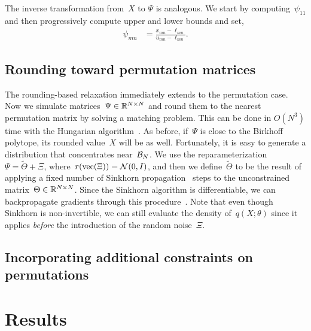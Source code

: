 The inverse transformation from~$X$ to $\Psi$ is analogous.
We start by computing~$\psi_{11}$ and then progressively compute
upper and lower bounds and set,
\begin{align}
\psi_{mn} &= \frac{x_{mn} - \ell_{mn}}{u_{mn} - \ell_{mn}}.
\end{align}


\subsection{Rounding toward permutation matrices}

The rounding-based relaxation immediately extends to the permutation
case.  Now we simulate matrices~$\Psi \in \mathbb{R}^{N \times N}$ and
round them to the nearest permutation matrix by solving a matching
problem.  This can be done in $O(N^3)$ time with the Hungarian
algorithm~\citep{kuhn1955hungarian, munkres1957algorithms}.  As
before, if~$\Psi$ is close to the Birkhoff polytope, its rounded
value~$X$ will be as well.  Fortunately, it is easy to generate a
distribution that concentrates near~$\mathcal{B}_N$.  We use the
reparameterization~${\Psi = \widetilde{\Theta} + \Xi}$,
where~${r(\operatorname{vec}(\Xi)) = \mathcal{N}(0, I)}$, and then we
define~${\widetilde{\Theta}}$ to be the
result of applying a fixed number of Sinkhorn propagation~\citep{knight2008sinkhorn} steps
to the unconstrained matrix~$\Theta \in \mathbb{R}^{N \times N}$.
Since the Sinkhorn algorithm is differentiable, we can backpropagate
gradients through this procedure~\citep[c.f.][]{adams2011ranking}.
Note that even though Sinkhorn is non-invertible, we can still
evaluate the density of~$q(X; \theta)$ since it applies \emph{before}
the introduction of the random noise~$\Xi$. 

\subsection{Incorporating additional constraints on permutations}

\section{Results}
\label{sec:results}

